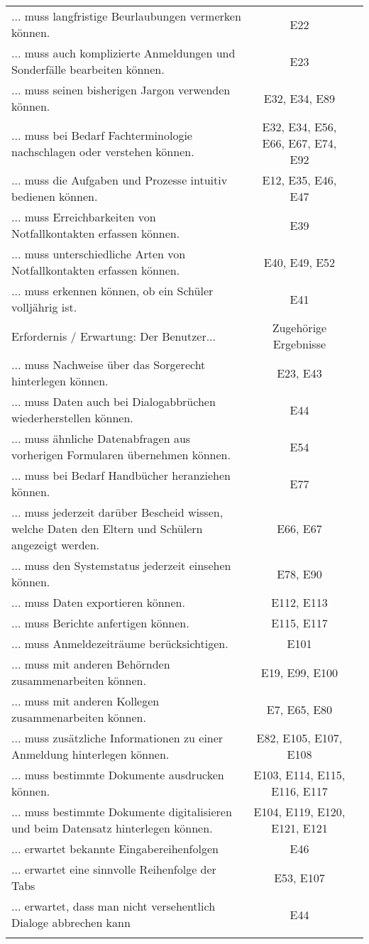 \begin{landscape}
\begin{longtable}{p{15cm}cc}
... muss langfristige Beurlaubungen vermerken können. & E22 \\
... muss auch komplizierte Anmeldungen und Sonderfälle bearbeiten können. & E23 \\
... muss seinen bisherigen Jargon verwenden können. & E32, E34, E89 \\
... muss bei Bedarf Fachterminologie nachschlagen oder verstehen können. & E32, E34, E56, E66, E67, E74, E92 \\
... muss die Aufgaben und Prozesse intuitiv bedienen können. & E12, E35, E46, E47 \\
... muss Erreichbarkeiten von Notfallkontakten erfassen können. & E39 \\
... muss unterschiedliche Arten von Notfallkontakten erfassen können. & E40, E49, E52 \\
... muss erkennen können, ob ein Schüler volljährig ist. & E41 \\
        \endfirsthead
        \toprule
        Erfordernis / Erwartung: Der Benutzer... & Zugehörige Ergebnisse \\
        \midrule
        \endhead
        \bottomrule
        \endfoot
... muss Nachweise über das Sorgerecht hinterlegen können. & E23, E43 \\
... muss Daten auch bei Dialogabbrüchen wiederherstellen können. & E44 \\
... muss ähnliche Datenabfragen aus vorherigen Formularen übernehmen können. & E54 \\
... muss bei Bedarf Handbücher heranziehen können. & E77 \\
... muss jederzeit darüber Bescheid wissen, welche Daten den Eltern und Schülern angezeigt werden. & E66, E67 \\
... muss den Systemstatus jederzeit einsehen können. & E78, E90 \\
... muss Daten exportieren können. & E112, E113 \\
... muss Berichte anfertigen können. & E115, E117 \\
... muss Anmeldezeiträume berücksichtigen. & E101 \\
... muss mit anderen Behörnden zusammenarbeiten können. & E19, E99, E100 \\
... muss mit anderen Kollegen zusammenarbeiten können. & E7, E65, E80 \\
... muss zusätzliche Informationen zu einer Anmeldung hinterlegen können. & E82, E105, E107, E108 \\
... muss bestimmte Dokumente ausdrucken können. & E103, E114, E115, E116, E117 \\
... muss bestimmte Dokumente digitalisieren und beim Datensatz hinterlegen können. & E104, E119, E120, E121, E121 \\
... erwartet bekannte Eingabereihenfolgen & E46 \\
... erwartet eine sinnvolle Reihenfolge der Tabs & E53, E107 \\
... erwartet, dass man nicht versehentlich Dialoge abbrechen kann & E44 \\
    \label{tab:erfordernisse}
\end{longtable}


\end{landscape}
